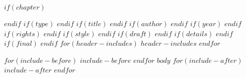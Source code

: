 $if(chapter)$
\setcounter{chapter}{$chapter$}
\addtocounter{chapter}{-1}
$endif$
$if(type)$
\renewcommand{\bookgentype}{$type$}
$endif$
$if(title)$
\renewcommand{\titleinfo}{$title$}
$endif$
$if(author)$
\renewcommand{\authorinfo}{$author$}
$endif$
$if(year)$
\renewcommand{\yearinfo}{$year$}
$endif$
$if(rights)$
\renewcommand{\rightsinfo}{$rights$}
$endif$
$if(style)$
\renewcommand{\editioninfo}{\capitalisewords{$style$}}
$endif$
$if(draft)$
\renewcommand{\draftinfo}{$draft$}
$endif$
$if(details)$
\renewcommand{\detailsinfo}{$details$}
$endif$
$if(final)$
\DraftOff
$endif$
$for(header-includes)$
$header-includes$
$endfor$

$for(include-before)$
$include-before$
$endfor$
$body$
$for(include-after)$
$include-after$
$endfor$
